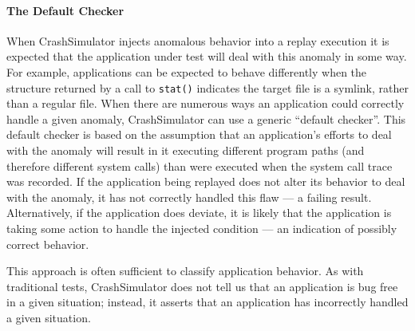 

\paragraph{The Default Checker}

When CrashSimulator injects anomalous behavior into a replay execution it is
expected that the application under test will deal with this
anomaly in some way. For example, applications
can be expected to behave differently when
the structure returned by a call to {\tt stat()} indicates the target file
is a symlink, rather than a regular file.
When there are numerous ways an
application could correctly handle a given anomaly, CrashSimulator 
can use a generic ``default checker''.  This default checker
is based on the assumption that an application's efforts to deal with the anomaly
will result in it executing different program paths (and therefore different
system calls) than were executed when the system call trace
was recorded.  If the application being replayed does not
alter its behavior to deal with the anomaly, it has not
correctly handled this flaw --- a failing result.  Alternatively, if the
application does deviate,
it is likely that the application is taking some action
to handle the injected condition --- an indication of possibly correct
behavior.

This approach is often sufficient to classify application behavior. %
As
with traditional tests, CrashSimulator does not tell us that an application is
bug free in a given situation; instead, it asserts that an application
has incorrectly handled a given situation.


